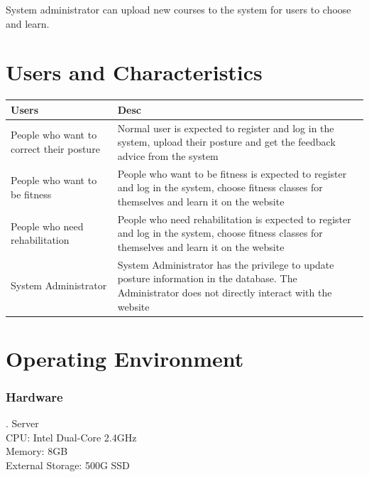 \documentclass[16pt]{scrreprt}
\begin{document}
System administrator can upload new courses to the system for users to choose and learn.\\

\section{Users and Characteristics}

 
\begin{center}
    \begin{tabular}{p{5cm}p{11cm}}
        \hline
	    Users & Desc\\
        \hline
	    People who want to correct their posture &  Normal user is expected to register and log in the system, upload their posture and get the feedback advice from the system\\
        \hline
	    People who want to be fitness & People who want to be fitness is expected to register and log in the system, choose fitness classes for themselves and learn it on the website\\
        \hline
        People who need rehabilitation & People who need rehabilitation is expected to register and log in the system, choose fitness classes for themselves and learn it on the website\\
        \hline
        System Administrator & System Administrator has the privilege to update posture information in the database. The Administrator does not directly interact with the website\\
        \hline
    \end{tabular}
\end{center}

 
\section{Operating Environment}

 
\subsubsection{Hardware}

 
. Server\\

 
CPU: Intel Dual-Core 2.4GHz\\

 
Memory: 8GB\\

 
External Storage: 500G SSD\\
\end{document}
